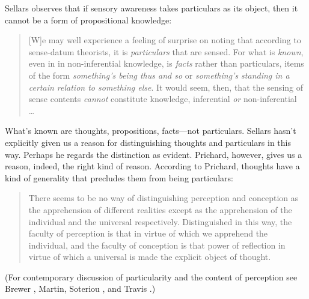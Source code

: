 \documentclass[12pt]{article}
\begin{document}
Sellars observes that if sensory awareness takes particulars as its object, then it cannot be a form of propositional knowledge:
\begin{quote}
	[W]e may well experience a feeling of surprise on noting that according to sense-datum theorists, it is \emph{particulars} that are sensed. For what is \emph{known}, even in in non-inferential knowledge, is \emph{facts} rather than particulars, items of the form \emph{something's being thus and so} or \emph{something's standing in a certain relation to something else}. It would seem, then, that the sensing of sense contents \emph{cannot} constitute knowledge, inferential \emph{or} non-inferential \ldots\ \citep[§3]{Sellars:1956xp}
\end{quote}
What's known are thoughts, propositions, facts---not particulars. Sellars hasn't explicitly given us a reason for distinguishing thoughts and particulars in this way. Perhaps he regards the distinction as evident. Prichard, however, gives us a reason, indeed, the right kind of reason. According to Prichard, thoughts have a kind of generality that precludes them from being particulars:
\begin{quote}
	There seems to be no way of distinguishing perception and conception as the apprehension of different realities except as the apprehension of the individual and the universal respectively. Distinguished in this way, the faculty of perception is that in virtue of which we apprehend the individual, and the faculty of conception is that power of reflection in virtue of which a universal is made the explicit object of thought. \citep[]{Prichard:1909yg}
\end{quote}
(For contemporary discussion of particularity and the content of perception see Brewer \citeyear{Brewer:2008fk}, Martin, \citeyear{Martin:2002jb} Soteriou \citeyear{Soteriou:2000iz,Soteriou:2005fk}, and Travis \citeyear{Travis:2005ys}.)

\end{document}
